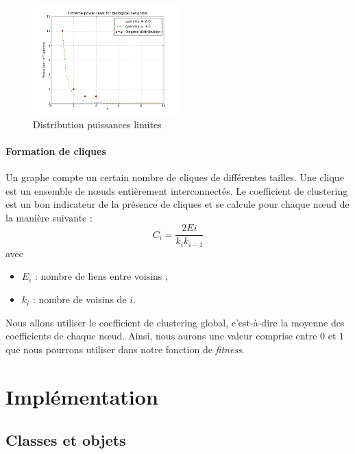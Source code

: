 \begin{figure}
  \vspace{-30pt}
  \begin{center}
    \includegraphics[width=0.50\textwidth]{Plot.png}
  \end{center}
  \caption{Distribution puissances limites}
  \label{scalefree}
\end{figure}
\paragraph*{Formation de cliques\\}

Un graphe compte un certain nombre de cliques de différentes tailles. Une clique est un ensemble de nœuds entièrement interconnectés. Le coefficient de clustering est un bon indicateur de la présence de cliques et se calcule pour chaque nœud de la manière suivante :
$$ C_i = \frac{2Ei}{k_i k_{i-1}} $$
avec
\begin{itemize}
 \item $E_i$ : nombre de liens entre voisins ;
 \item $k_i$ : nombre de voisins de $i$.
\end{itemize}
Nous allons utiliser le coefficient de clustering global, c'est-à-dire la moyenne des coefficients de chaque nœud. Ainsi, nous aurons une valeur comprise entre $0$ et $1$ que nous pourrons utiliser dans notre fonction de \textit{fitness}.



\section{Implémentation}

\subsection{Classes et objets}

